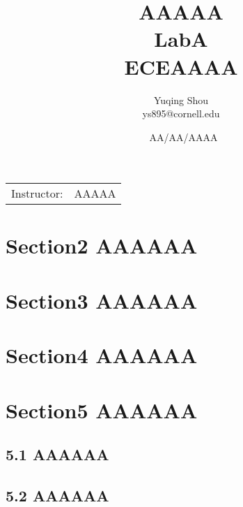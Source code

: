 \documentclass{article}
\title{AAAAA \\ LabA \\ ECEAAAA} %
\author{Yuqing Shou \\ ys895@cornell.edu} %
\date{\ AA/AA/AAAA} %
\begin{document}
\maketitle %
\begin{center}
\begin{tabular}{l r}
Instructor: & AAAAA %
\end{tabular}
\end{center}


\newpage
\section*{Section2 AAAAAA}


\newpage
\section*{Section3 AAAAAA}


\newpage
\section*{Section4 AAAAAA}


\newpage
\section*{Section5 AAAAAA}
\subsection*{5.1 AAAAAA}

\newpage
\subsection*{5.2 AAAAAA}







\begin{comment}
\end{comment}

\begin{comment}
\begin{figure}[H]
\centering
\texttt{[image: prob\_plot]}
\caption{ Probability plot}
\end{figure}
\end{comment}
\end{document}
